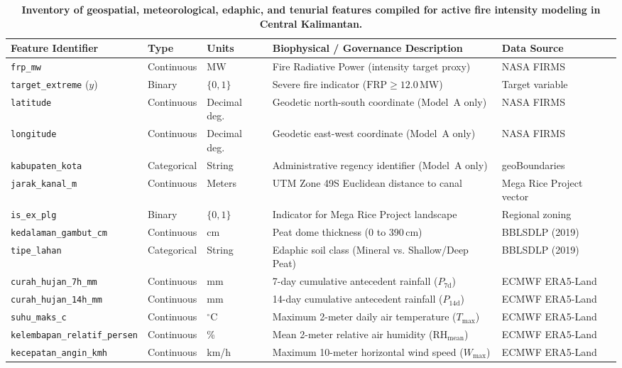 \begin{table}[htbp]
\centering
\caption{\textbf{Inventory of geospatial, meteorological, edaphic, and tenurial features compiled for active fire intensity modeling in Central Kalimantan.}}
\label{tab:feature_inventory}
\small
\begin{tabular}{lllll}
\toprule
\textbf{Feature Identifier} & \textbf{Type} & \textbf{Units} & \textbf{Biophysical / Governance Description} & \textbf{Data Source} \\
\midrule
\texttt{frp\_mw} & Continuous & MW & Fire Radiative Power (intensity target proxy) & NASA FIRMS \\
\texttt{target\_extreme} ($y$) & Binary & $\{0, 1\}$ & Severe fire indicator ($\text{FRP} \ge 12.0$\,MW) & Target variable \\
\texttt{latitude} & Continuous & Decimal deg. & Geodetic north-south coordinate (Model~A only) & NASA FIRMS \\
\texttt{longitude} & Continuous & Decimal deg. & Geodetic east-west coordinate (Model~A only) & NASA FIRMS \\
\texttt{kabupaten\_kota} & Categorical & String & Administrative regency identifier (Model~A only) & geoBoundaries \\
\texttt{jarak\_kanal\_m} & Continuous & Meters & UTM Zone 49S Euclidean distance to canal & Mega Rice Project vector \\
\texttt{is\_ex\_plg} & Binary & $\{0, 1\}$ & Indicator for Mega Rice Project landscape & Regional zoning \\
\texttt{kedalaman\_gambut\_cm} & Continuous & cm & Peat dome thickness (0 to 390\,cm) & BBLSDLP (2019) \\
\texttt{tipe\_lahan} & Categorical & String & Edaphic soil class (Mineral vs. Shallow/Deep Peat) & BBLSDLP (2019) \\
\texttt{curah\_hujan\_7h\_mm} & Continuous & mm & 7-day cumulative antecedent rainfall ($P_{\text{7d}}$) & ECMWF ERA5-Land \\
\texttt{curah\_hujan\_14h\_mm} & Continuous & mm & 14-day cumulative antecedent rainfall ($P_{\text{14d}}$) & ECMWF ERA5-Land \\
\texttt{suhu\_maks\_c} & Continuous & $^\circ\text{C}$ & Maximum 2-meter daily air temperature ($T_{\text{max}}$) & ECMWF ERA5-Land \\
\texttt{kelembapan\_relatif\_persen} & Continuous & \% & Mean 2-meter relative air humidity ($\text{RH}_{\text{mean}}$) & ECMWF ERA5-Land \\
\texttt{kecepatan\_angin\_kmh} & Continuous & km/h & Maximum 10-meter horizontal wind speed ($W_{\text{max}}$) & ECMWF ERA5-Land \\

\end{tabular}
\end{table}
